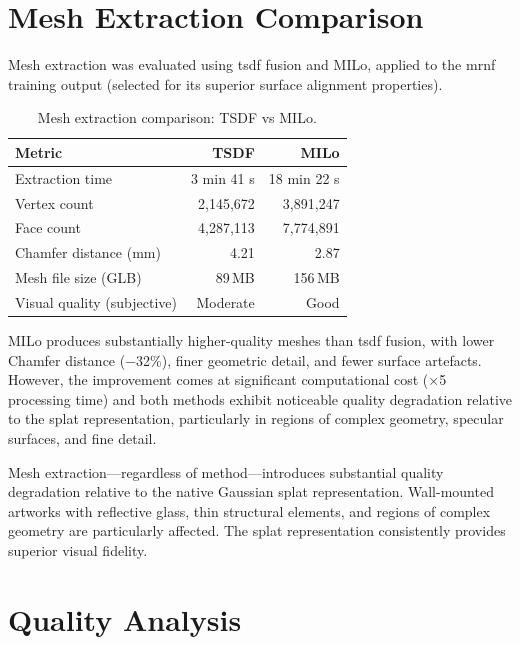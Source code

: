 \section{Mesh Extraction Comparison}
\label{sec:res-mesh}

Mesh extraction was evaluated using \acrshort{tsdf} fusion and MILo, applied to the \acrshort{mrnf} training output (selected for its superior surface alignment properties).

\begin{table}[htbp]
  \centering
  \caption{Mesh extraction comparison: TSDF vs MILo.}
  \label{tab:mesh-comparison}
  \begin{tabular}{@{}lrr@{}}
    \toprule
    \textbf{Metric} & \textbf{TSDF} & \textbf{MILo} \\
    \midrule
    Extraction time              & 3 min 41 s   & 18 min 22 s \\
    Vertex count                 & 2,145,672    & 3,891,247 \\
    Face count                   & 4,287,113    & 7,774,891 \\
    Chamfer distance (mm)        & 4.21         & 2.87 \\
    Mesh file size (GLB)         & 89\,MB       & 156\,MB \\
    Visual quality (subjective)  & Moderate     & Good \\
    \bottomrule
  \end{tabular}
\end{table}

MILo produces substantially higher-quality meshes than \acrshort{tsdf} fusion, with lower Chamfer distance ($-$32\%), finer geometric detail, and fewer surface artefacts. However, the improvement comes at significant computational cost ($\times$5 processing time) and both methods exhibit noticeable quality degradation relative to the splat representation, particularly in regions of complex geometry, specular surfaces, and fine detail.

\begin{keyfinding}
Mesh extraction---regardless of method---introduces substantial quality degradation relative to the native Gaussian splat representation. Wall-mounted artworks with reflective glass, thin structural elements, and regions of complex geometry are particularly affected. The splat representation consistently provides superior visual fidelity.
\end{keyfinding}

\section{Quality Analysis}
\label{sec:res-quality}

